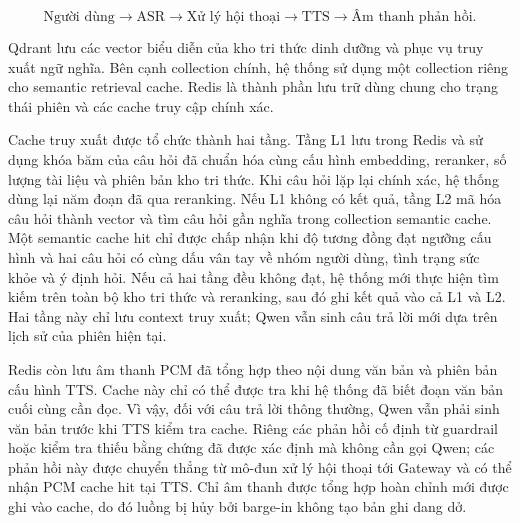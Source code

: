 \documentclass[a4paper,13pt,oneside]{report}
\begin{document}
\begin{equation}
    \text{Người dùng}
    \rightarrow \text{ASR}
    \rightarrow \text{Xử lý hội thoại}
    \rightarrow \text{TTS}
    \rightarrow \text{Âm thanh phản hồi}.
\end{equation}

Qdrant lưu các vector biểu diễn của kho tri thức dinh dưỡng và phục vụ truy xuất ngữ nghĩa. Bên cạnh collection chính, hệ thống sử dụng một collection riêng cho semantic retrieval cache. Redis là thành phần lưu trữ dùng chung cho trạng thái phiên và các cache truy cập chính xác.

Cache truy xuất được tổ chức thành hai tầng. Tầng L1 lưu trong Redis và sử dụng khóa băm của câu hỏi đã chuẩn hóa cùng cấu hình embedding, reranker, số lượng tài liệu và phiên bản kho tri thức. Khi câu hỏi lặp lại chính xác, hệ thống dùng lại năm đoạn đã qua reranking. Nếu L1 không có kết quả, tầng L2 mã hóa câu hỏi thành vector và tìm câu hỏi gần nghĩa trong collection semantic cache. Một semantic cache hit chỉ được chấp nhận khi độ tương đồng đạt ngưỡng cấu hình và hai câu hỏi có cùng dấu vân tay về nhóm người dùng, tình trạng sức khỏe và ý định hỏi. Nếu cả hai tầng đều không đạt, hệ thống mới thực hiện tìm kiếm trên toàn bộ kho tri thức và reranking, sau đó ghi kết quả vào cả L1 và L2. Hai tầng này chỉ lưu context truy xuất; Qwen vẫn sinh câu trả lời mới dựa trên lịch sử của phiên hiện tại.

Redis còn lưu âm thanh PCM đã tổng hợp theo nội dung văn bản và phiên bản cấu hình TTS. Cache này chỉ có thể được tra khi hệ thống đã biết đoạn văn bản cuối cùng cần đọc. Vì vậy, đối với câu trả lời thông thường, Qwen vẫn phải sinh văn bản trước khi TTS kiểm tra cache. Riêng các phản hồi cố định từ guardrail hoặc kiểm tra thiếu bằng chứng đã được xác định mà không cần gọi Qwen; các phản hồi này được chuyển thẳng từ mô-đun xử lý hội thoại tới Gateway và có thể nhận PCM cache hit tại TTS. Chỉ âm thanh được tổng hợp hoàn chỉnh mới được ghi vào cache, do đó luồng bị hủy bởi barge-in không tạo bản ghi dang dở.
\end{document}
